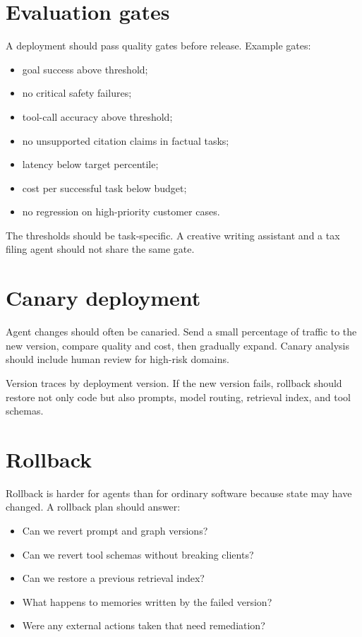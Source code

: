 \section{Evaluation gates}

A deployment should pass quality gates before release. Example gates:

\begin{itemize}[leftmargin=*]
  \item goal success above threshold;
  \item no critical safety failures;
  \item tool-call accuracy above threshold;
  \item no unsupported citation claims in factual tasks;
  \item latency below target percentile;
  \item cost per successful task below budget;
  \item no regression on high-priority customer cases.
\end{itemize}

The thresholds should be task-specific. A creative writing assistant and a tax filing agent should not share the same gate.

\section{Canary deployment}

Agent changes should often be canaried. Send a small percentage of traffic to the new version, compare quality and cost, then gradually expand. Canary analysis should include human review for high-risk domains.

Version traces by deployment version. If the new version fails, rollback should restore not only code but also prompts, model routing, retrieval index, and tool schemas.

\section{Rollback}

Rollback is harder for agents than for ordinary software because state may have changed. A rollback plan should answer:

\begin{itemize}[leftmargin=*]
  \item Can we revert prompt and graph versions?
  \item Can we revert tool schemas without breaking clients?
  \item Can we restore a previous retrieval index?
  \item What happens to memories written by the failed version?
  \item Were any external actions taken that need remediation?
\end{itemize}

